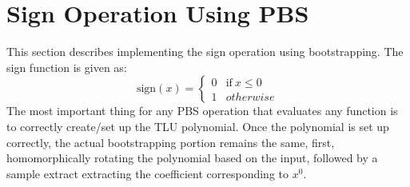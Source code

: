 \documentclass{report}
\begin{document}
\section{Sign Operation Using PBS}
This section describes implementing the sign operation using bootstrapping. The sign function is given as:
\begin{equation}
	\text{sign}(x) = 
	\begin{cases}
		0 & \text{if} \ x \leq 0\\
		1 & otherwise
	\end{cases}
\end{equation}
The most important thing for any PBS operation that evaluates any function is to correctly create/set up the TLU polynomial. Once the polynomial is set up correctly, the actual bootstrapping portion remains the same, first, homomorphically rotating the polynomial based on the input, followed by a sample extract extracting the coefficient corresponding to $x^0$.
\end{document}
